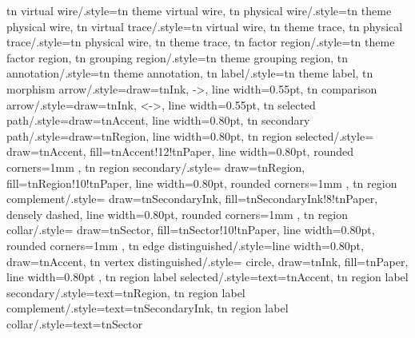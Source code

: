{    %
    tn virtual wire/.style={tn theme virtual wire},
    tn physical wire/.style={tn theme physical wire},
    tn virtual trace/.style={tn virtual wire, tn theme trace},
    tn physical trace/.style={tn physical wire, tn theme trace},
    tn factor region/.style={tn theme factor region},
    tn grouping region/.style={tn theme grouping region},
    tn annotation/.style={tn theme annotation},
    tn label/.style={tn theme label},
    tn morphism arrow/.style={draw=tnInk, ->, line width=0.55pt},
    tn comparison arrow/.style={draw=tnInk, <->, line width=0.55pt},
    tn selected path/.style={draw=tnAccent, line width=0.80pt},
    tn secondary path/.style={draw=tnRegion, line width=0.80pt},
    tn region selected/.style={
            draw=tnAccent,
            fill=tnAccent!12!tnPaper,
            line width=0.80pt,
            rounded corners=1mm
        },
    tn region secondary/.style={
            draw=tnRegion,
            fill=tnRegion!10!tnPaper,
            line width=0.80pt,
            rounded corners=1mm
        },
    tn region complement/.style={
            draw=tnSecondaryInk,
            fill=tnSecondaryInk!8!tnPaper,
            densely dashed,
            line width=0.80pt,
            rounded corners=1mm
        },
    tn region collar/.style={
            draw=tnSector,
            fill=tnSector!10!tnPaper,
            line width=0.80pt,
            rounded corners=1mm
        },
    tn edge distinguished/.style={line width=0.80pt, draw=tnAccent},
    tn vertex distinguished/.style={
            circle,
            draw=tnInk,
            fill=tnPaper,
            line width=0.80pt
        },
    tn region label selected/.style={text=tnAccent},
    tn region label secondary/.style={text=tnRegion},
    tn region label complement/.style={text=tnSecondaryInk},
    tn region label collar/.style={text=tnSector}
}


\makeatletter

